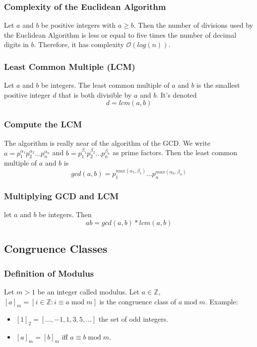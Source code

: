 \documentclass{article}
\begin{document}
\subsubsection{Complexity of the Euclidean Algorithm}
\begin{tcolorbox}[sharp corners, colback=green!30, colframe=green!80!blue, title=Lamé's Theorem]
Let $ a $ and $ b $ be positive integers with $ a \geq b $. Then the number of divisions used by the Euclidean Algorithm is less or equal to five times the number of decimal digits in $ b $. Therefore, it has complexity $ \mathcal{O}(log(n)) $.
\end{tcolorbox}

\subsubsection{Least Common Multiple (LCM)} Let $ a $ and $ b $ be integers. The least common multiple of $ a $ and $ b $ is the smallest positive integer $ d $ that is both divisible by $ a $ and $ b $. It's denoted
\begin{equation}
d = lcm(a,b)
\end{equation}

\subsubsection{Compute the LCM} The algorithm is really near of the algorithm of the GCD. We write $ a = p_{1}^{\alpha_1}p_{2}^{\alpha_2}...p_{n}^{\alpha_n} $ and $ b = p_{1}^{\beta_1}p_{2}^{\beta_2}...p_{n}^{\beta_n} $ as prime factors. Then the least common multiple of $ a $ and $ b $ is
\begin{equation}
gcd(a,b) = p_{1}^{max(\alpha_1,\beta_1)}...p_{n}^{max(\alpha_n,\beta_n)}
\end{equation}

\subsubsection{Multiplying GCD and LCM} let $ a $ and $ b $ be integers. Then
\begin{equation}
ab = gcd(a,b) * lcm(a,b)
\end{equation}

\subsection{Congruence Classes}
\subsubsection{Definition of Modulus} Let $ m > 1 $ be an integer called modulus. Let $ a \in \mathbb{Z} $, $ [a]_m = [i \in \mathbb{Z} : i \equiv a \;\mathrm{mod}\; m] $ is the congruence class of $ a \;\mathrm{mod}\; m $. Example:
\begin{itemize}
\item $ [1]_2 = [...,-1,1,3,5,...] $ the set of odd integers.
\item $ [a]_m = [b]_m $ iff $ a \equiv b \;\mathrm{mod}\; m $.
\end{itemize}
\end{document}
